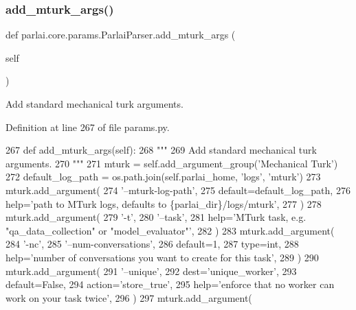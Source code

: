 \subsubsection{\texorpdfstring{add\+\_\+mturk\+\_\+args()}{add\_mturk\_args()}}
{\footnotesize\ttfamily def parlai.\+core.\+params.\+Parlai\+Parser.\+add\+\_\+mturk\+\_\+args (\begin{DoxyParamCaption}\item[{}]{self }\end{DoxyParamCaption})}

\begin{DoxyVerb}Add standard mechanical turk arguments.
\end{DoxyVerb}
 

Definition at line 267 of file params.\+py.


\begin{DoxyCode}
267     \textcolor{keyword}{def }add\_mturk\_args(self):
268         \textcolor{stringliteral}{"""}
269 \textcolor{stringliteral}{        Add standard mechanical turk arguments.}
270 \textcolor{stringliteral}{        """}
271         mturk = self.add\_argument\_group(\textcolor{stringliteral}{'Mechanical Turk'})
272         default\_log\_path = os.path.join(self.parlai\_home, \textcolor{stringliteral}{'logs'}, \textcolor{stringliteral}{'mturk'})
273         mturk.add\_argument(
274             \textcolor{stringliteral}{'--mturk-log-path'},
275             default=default\_log\_path,
276             help=\textcolor{stringliteral}{'path to MTurk logs, defaults to \{parlai\_dir\}/logs/mturk'},
277         )
278         mturk.add\_argument(
279             \textcolor{stringliteral}{'-t'},
280             \textcolor{stringliteral}{'--task'},
281             help=\textcolor{stringliteral}{'MTurk task, e.g. "qa\_data\_collection" or "model\_evaluator"'},
282         )
283         mturk.add\_argument(
284             \textcolor{stringliteral}{'-nc'},
285             \textcolor{stringliteral}{'--num-conversations'},
286             default=1,
287             type=int,
288             help=\textcolor{stringliteral}{'number of conversations you want to create for this task'},
289         )
290         mturk.add\_argument(
291             \textcolor{stringliteral}{'--unique'},
292             dest=\textcolor{stringliteral}{'unique\_worker'},
293             default=\textcolor{keyword}{False},
294             action=\textcolor{stringliteral}{'store\_true'},
295             help=\textcolor{stringliteral}{'enforce that no worker can work on your task twice'},
296         )
297         mturk.add\_argument(

\end{DoxyCode}
